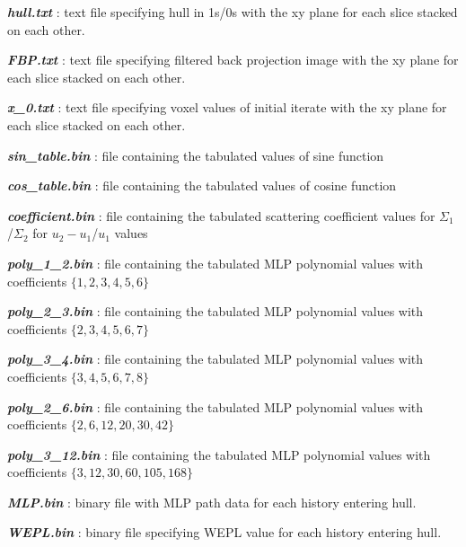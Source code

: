 \documentclass[landscape]{article}
\begin{document}
\begin{myEnumerate}[labelindent=0pt, leftmargin=*]
\begin{myEnumerate}[labelindent=1pt, leftmargin=*]
\begin{myEnumerate}[labelindent=1pt, leftmargin=*]
\begin{myEnumerate}[labelindent=1pt, leftmargin=*]
\begin{myEnumerate}[labelindent=1pt, leftmargin=*]
\begin{myEnumerate}[labelindent=1pt, leftmargin=*]
\begin{myEnumerate}[labelindent=1pt, leftmargin=*]
\begin{myEnumerate}[labelindent=1pt, leftmargin=*]
\begin{myEnumerate}[labelindent=1pt, leftmargin=*]
                                    \item \textbf{\textit{hull.txt}} : text file specifying hull in 1s/0s with the xy plane for each slice stacked on each other.
                                    \item \textbf{\textit{FBP.txt}} : text file specifying filtered back projection image with the xy plane for each slice stacked on each other.
                                    \item \textbf{\textit{x\_0.txt}} : text file specifying voxel values of initial iterate with the xy plane for each slice stacked on each other.
                                    \item \textbf{\textit{sin\_table.bin}} : file containing the tabulated values of sine function
                                    \item \textbf{\textit{cos\_table.bin}} : file containing the tabulated values of cosine function
                                    \item \textbf{\textit{coefficient.bin}} : file containing the tabulated scattering coefficient values for $\Sigma_1$/$\Sigma_2$ for $u_2-u_1$/$u_1$ values
                                    \item \textbf{\textit{poly\_1\_2.bin}} : file containing the tabulated MLP polynomial values with coefficients $\{1,2,3,4,5,6\}$
                                    \item \textbf{\textit{poly\_2\_3.bin}} : file containing the tabulated MLP polynomial values with coefficients $\{2,3,4,5,6,7\}$
                                    \item \textbf{\textit{poly\_3\_4.bin}} : file containing the tabulated MLP polynomial values with coefficients $\{3,4,5,6,7,8\}$
                                    \item \textbf{\textit{poly\_2\_6.bin}} : file containing the tabulated MLP polynomial values with coefficients $\{2,6,12,20,30,42\}$
                                    \item \textbf{\textit{poly\_3\_12.bin}} : file containing the tabulated MLP polynomial values with coefficients $\{3,12,30,60,105,168\}$
                                    \item \textbf{\textit{MLP.bin}} : binary file with MLP path data for each history entering hull.
                                    \item \textbf{\textit{WEPL.bin}} : binary file specifying WEPL value for each history entering hull.

\end{myEnumerate}
\end{myEnumerate}
\end{myEnumerate}
\end{myEnumerate}
\end{myEnumerate}
\end{myEnumerate}
\end{myEnumerate}
\end{myEnumerate}
\end{myEnumerate}
\end{document}

